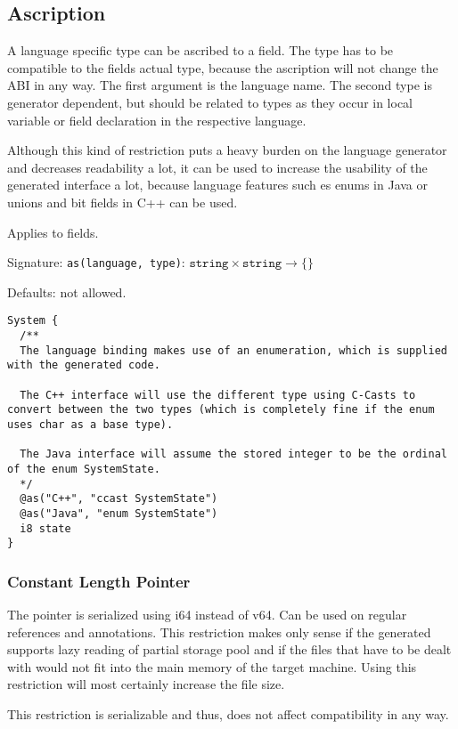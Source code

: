 \subsection*{Ascription}
A language specific type can be ascribed to a field. The type has to be compatible to the fields actual type, because the ascription will not change the ABI in any way. The first argument is the language name. The second type is generator dependent, but should be related to types as they occur in local variable or field declaration in the respective language.

Although this kind of restriction puts a heavy burden on the language generator and decreases readability a lot, it can be used to increase the usability of the generated interface a lot, because language features such es enums in Java or unions and bit fields in C++ can be used.

Applies to fields.

Signature: \verb/as(language, type)/: $\texttt{string} \times \texttt{string} → \{\}$

Defaults: not allowed.

\begin{lstlisting}[label=ascriptionExample,caption=Examples,language=skill]
System {
  /**
  The language binding makes use of an enumeration, which is supplied with the generated code.
  
  The C++ interface will use the different type using C-Casts to convert between the two types (which is completely fine if the enum uses char as a base type).
  
  The Java interface will assume the stored integer to be the ordinal of the enum SystemState.
  */
  @as("C++", "ccast SystemState")
  @as("Java", "enum SystemState")
  i8 state
}
\end{lstlisting}


\subsubsection*{Constant Length Pointer}
The pointer is serialized using i64 instead of v64. Can be used on regular references and annotations. This restriction makes only sense if the generated supports lazy reading of partial storage pool and if the files that have to be dealt with would not fit into the main memory of the target machine. Using this restriction will most certainly increase the file size.

This restriction is serializable and thus, does not affect compatibility in any way.

